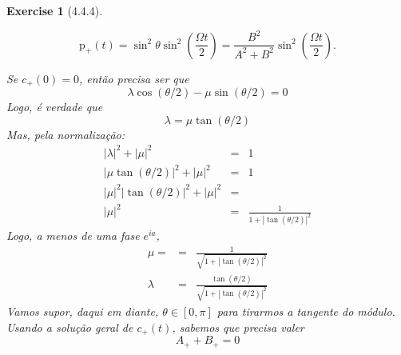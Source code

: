 \documentclass[12pt]{article}
\def\be{\begin{equation}}
\def\ee{\end{equation}}
\def\bea{\begin{eqnarray*}}
\def\eea{\end{eqnarray*}}
\def\f{\frac}
\newtheorem{exercise}{Exercise}
\begin{document}
\begin{exercise}[4.4.4]
\begin{exercises}
		$$
		\mathrm{p}_{+}(t)=\sin ^{2} \theta \sin ^{2}\left(\frac{\Omega t}{2}\right)=\frac{B^{2}}{A^{2}+B^{2}} \sin ^{2}\left(\frac{\Omega t}{2}\right) .
		$$
		\begin{multianswer}[true]
			Se $c_+(0)=0$, então precisa ser que
			\be
				 \lambda\cos(\theta/2) - \mu\sin(\theta/2) = 0
			\ee
			Logo, é verdade que
			\be
				\lambda = \mu \tan(\theta/2)
			\ee
			Mas, pela normalização:
			\bea
				|\lambda|^2 + |\mu|^2 &=& 1 \\
				|\mu\tan(\theta/2)|^2 + |\mu|^2 &=& 1 \\
				|\mu|^2|\tan(\theta/2)|^2 + |\mu|^2 &=& \\
				|\mu|^2 &=& \f{1}{1 + |\tan(\theta/2)|^2}
			\eea
			Logo, a menos de uma fase $e^{ia}$, 
			\bea
				\mu =  &=& \f{1}{\sqrt{1 + |\tan(\theta/2)|^2}} \\
				\lambda  &=& \f{\tan(\theta/2)}{\sqrt{1 + |\tan(\theta/2)|^2}}
			\eea
			Vamos supor, daqui em diante, $\theta\in[0, \pi]$ para tirarmos a tangente do módulo. Usando a solução geral de $c_+(t)$, sabemos que precisa valer
			\be
				A_+ + B_+ = 0
			\ee
			
		\end{multianswer}
		\end{exercises}
	\end{exercise}
	
\end{document}
